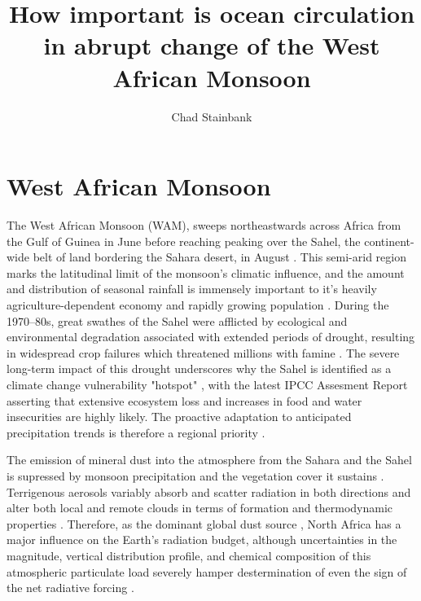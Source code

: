 \documentclass[a4paper]{article}
\begin{document}
\title{How important is ocean circulation in abrupt change of the West African Monsoon}
\author{Chad Stainbank}
\maketitle

\section{West African Monsoon}
\label{sec:sahelwam}
The West African Monsoon (WAM), sweeps northeastwards across Africa from the Gulf of Guinea in June before reaching peaking over the Sahel, the continent-wide belt of land bordering the Sahara desert, in August \parencite{sultan2003west2, nicholson2013west}.
This semi-arid region marks the latitudinal limit of the monsoon's climatic influence, and the amount and distribution of seasonal rainfall is immensely important to it's heavily agriculture-dependent economy and rapidly growing population \parencite{sissoko2011agriculture}.
During the 1970--80s, great swathes of the Sahel were afflicted by ecological and environmental degradation associated with extended periods of drought, resulting in widespread crop failures which threatened millions with famine \parencite{benson1998impact, olsson1993causes, walther2016review}.
The severe long-term impact of this drought underscores why the Sahel is identified as a climate change vulnerability "hotspot" \parencite{diffenbaugh2012climate}, with the latest IPCC Assesment Report \parencite{ipcc2014impacts} asserting that extensive ecosystem loss and increases in food and water insecurities are highly likely.
The proactive adaptation to anticipated precipitation trends is therefore a regional priority \parencite{lobell2008prioritizing, sarr2012present}.

The emission of mineral dust into the atmosphere from the Sahara and the Sahel is supressed by monsoon precipitation and the vegetation cover it sustains \parencite{brooks2000dust, cowie2013vegetation}.
Terrigenous aerosols variably absorb and scatter radiation in both directions \parencite{andreae1995climatic, tegen1996influence, haywood2000estimates} and alter both local and remote clouds in terms of formation and thermodynamic properties \parencite{rosenfeld2001desert, demott2003african, huang2006possible, karydis2011effect}.  
Therefore, as the dominant global dust source \parencite{tanaka2006numerical}, North Africa has a major influence on the Earth's radiation budget, although uncertainties in the magnitude, vertical distribution profile, and chemical composition of this atmospheric particulate load severely hamper destermination of even the sign of the net radiative forcing \parencite{claquin1998uncertainties, sokolik2001introduction, durant2009sensitivity}.
\end{document}

